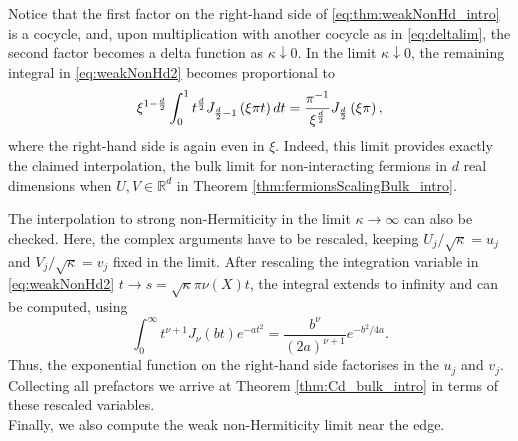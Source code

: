 \documentclass[%
 jmp,
cp,  %
 amsmath,amsthm,amssymb,%
 reprint,%
onecolumn]{revtex4-2}
\begin{document}
Notice that the first factor on the right-hand side of \eqref{eq:thm:weakNonHd_intro} is a cocycle, and, upon multiplication with another cocycle as in \eqref{eq:deltalim}, the second factor becomes a delta function as $\kappa\downarrow 0$.  In the limit $\kappa\downarrow 0$, the remaining integral in \eqref{eq:weakNonHd2} becomes proportional to \cite[6.561.5]{Grad}
\begin{align}
\xi^{1-\frac{d}{2}} \int_0^{1}  t^\frac{d}{2} J_{\frac{d}{2}-1}\left(
\xi\pi t\right) dt
= 
\frac{\pi^{
-1}}{
\xi^\frac{d}{2}} J_\frac{d}{2}\left(\xi\pi 
\right),
\end{align}
where the right-hand side is again even in $\xi$. Indeed, this limit provides  exactly 
the claimed interpolation,  
the bulk limit for non-interacting fermions in $d$ real dimensions when $U, V\in\mathbb R^d$ in Theorem \ref{thm:fermionsScalingBulk_intro}. 

The interpolation to strong non-Hermiticity in the limit $\kappa\to \infty$ can also be checked. Here, the  complex arguments have to be rescaled, keeping $U_j/\sqrt{\kappa}=u_j$ and $V_j/\sqrt{\kappa}=v_j$ fixed in the limit. After rescaling the integration variable in \eqref{eq:weakNonHd2} $t\to s =\sqrt{\kappa}\pi\nu(X)t$, the integral extends to infinity and can be computed, using \cite[6.631.4]{Grad}
\begin{equation*}
\int_0^\infty t^{\nu+1}J_\nu(bt) e^{-at^2} =\frac{b^\nu}{(2a)^{\nu+1}} e^{-b^2/4a}.
\end{equation*}
Thus, the exponential function on the right-hand side factorises in the $u_j$ and $v_j$. Collecting all prefactors
we arrive at Theorem \ref{thm:Cd_bulk_intro} in terms of these rescaled variables.\\


    
Finally, we also  compute the weak non-Hermiticity limit near the edge.
      
\end{document}
